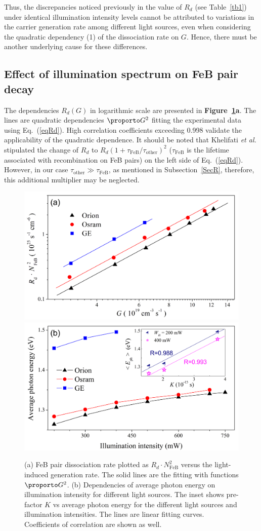 \documentclass{WileyMSP-template}
\begin{document}
Thus, the discrepancies noticed previously in the value of $R_d$ (see Table~\ref{tb1}) under identical illumination intensity levels
cannot be attributed to variations in the carrier generation rate among different light sources,
even when considering the quadratic dependency (1) of the dissociation rate on $G$.
Hence, there must be another underlying cause for these differences.


\subsection{Effect of illumination spectrum on FeB pair decay}\label{SecLast}

The dependencies $R_d (G)$ in logarithmic scale are presented in \textbf{Figure~\ref{fig6}a}.
The lines are quadratic dependencies $\proporto G^2$ fitting the experimental data using Eq.~(\ref{eqRd}).
High correlation coefficients exceeding 0.998 validate the applicability of the quadratic dependence.
It should be noted that Khelifati \emph{et al.} \cite{FeBKin2019} stipulated the change of $R_d$ to
$R_d\left(1+\tau_\mathrm{FeB}/\tau_\mathrm{other}\right)^2$ ($\tau_\mathrm{FeB}$ is the lifetime associated with recombination on FeB pairs)
on the left side of Eq.~(\ref{eqRd}).
However, in our case $\tau_\mathrm{other}\gg \tau_\mathrm{FeB}$, as mentioned in Subsection~\ref{SecR}, therefore,
this additional multiplier may be neglected.


\begin{figure}
\centering
  \includegraphics[width=0.4\linewidth]{Fig6a.png}
  \includegraphics[width=0.4\linewidth]{Fig6b.png}
  \caption{
  (a) FeB pair dissociation rate plotted as $R_d\cdot N_\mathrm{FeB}^2$ versus the light-induced
  generation rate. The solid lines are the fitting with functions $\proporto G^2$.
  (b) Dependencies of average photon energy on illumination intensity for different light sources.
  The inset shows pre-factor $K$ vs average photon energy for the different light sources and illumination intensities.
  The lines are linear fitting curves. Coefficients of correlation are shown as well.
  }
  \label{fig6}
\end{figure}
\end{document}
